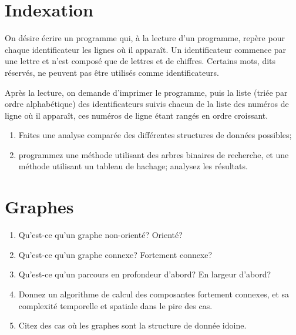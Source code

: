 \documentclass[11pt, a4paper]{article}
\begin{document}
\section{Indexation}

On désire écrire un programme qui, à la lecture d'un programme, repère
pour chaque identificateur les lignes où il apparaît. Un
identificateur commence par une lettre et n'est composé que de lettres
et de chiffres. Certains mots, dits réservés, ne peuvent pas être
utilisés comme identificateurs.

Après la lecture, on demande d'imprimer le programme, puis la liste
(triée par ordre alphabétique) des identificateurs suivis chacun de la
liste des numéros de ligne où il apparaît, ces numéros de ligne étant
rangés en ordre croissant.

  \begin{enumerate}

    \item Faites une analyse comparée des différentes structures de
          données possibles;

    \item programmez une méthode utilisant des arbres binaires de
          recherche, et une méthode utilisant un tableau de hachage;
          analysez les résultats.

  \end{enumerate}


\section{Graphes}

  \begin{enumerate}

    \item Qu'est-ce qu'un graphe non-orienté? Orienté?

    \item Qu'est-ce qu'un graphe connexe? Fortement connexe?

    \item Qu'est-ce qu'un parcours en profondeur d'abord? En largeur
          d'abord?

    \item Donnez un algorithme de calcul des composantes fortement
          connexes, et sa complexité temporelle et spatiale dans le
          pire des cas.

    \item Citez des cas où les graphes sont la structure de donnée
          idoine.

  \end{enumerate}
\end{document}
